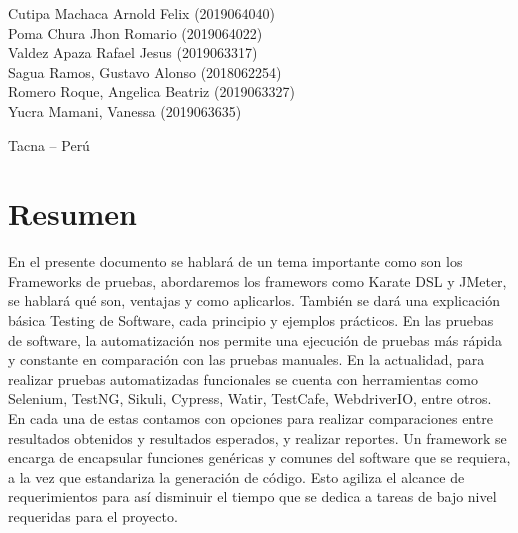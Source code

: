 \documentclass{article}
\begin{document}
\begin{titlepage}
\begin{center}
\begin{large}
\begin{flushleft}
Cutipa Machaca Arnold Felix         	\hfill	(2019064040) \\
Poma Chura Jhon Romario             	\hfill	(2019064022) \\
Valdez Apaza Rafael Jesus                \hfill	(2019063317) \\
Sagua Ramos, Gustavo Alonso               \hfill(2018062254) \\
Romero Roque, Angelica Beatriz            \hfill(2019063327) \\
Yucra Mamani, Vanessa                    \hfill(2019063635) \\


\end{flushleft}
\newline
\begin{center}
Tacna – Perú
\end{center}

\end{large}
\end{center}

\end{titlepage}

\maketitle

\section{Resumen}
\newline
\newline En el presente documento se hablará de un tema importante como son los Frameworks de pruebas, abordaremos los framewors como Karate DSL y JMeter, se hablará qué son, ventajas y como aplicarlos. 
\newline
También se dará una explicación básica Testing de Software, cada principio y ejemplos prácticos. 
\newline
\newline
En las pruebas de software, la automatización nos permite una ejecución de pruebas más rápida y constante en comparación con las pruebas manuales. En la actualidad, para realizar pruebas automatizadas funcionales se cuenta con herramientas como Selenium, TestNG, Sikuli, Cypress, Watir, TestCafe, WebdriverIO, entre otros. En cada una de estas contamos con opciones para realizar comparaciones entre resultados obtenidos y resultados esperados, y realizar reportes.
\newline
\newline
Un framework se encarga de encapsular funciones genéricas y comunes del software que se requiera, a la vez que estandariza la generación de código. Esto agiliza el alcance de requerimientos para así disminuir el tiempo que se dedica a tareas de bajo nivel requeridas para el proyecto. 
\end{document}
